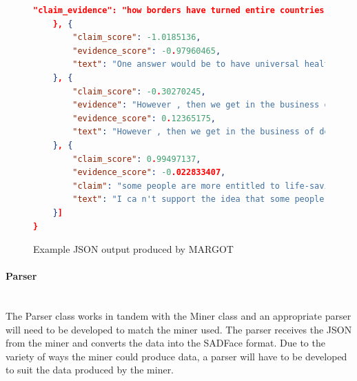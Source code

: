 \documentclass[12pt,a4paper]{article}
\begin{document}
\begin{figure}[H]
\begin{lstlisting}[language=json,firstnumber=1]
		"claim_evidence": "how borders have turned entire countries and regions into warpeople could come over from other countriesa contribution to the American economy to sustain the system"
	}, {
		"claim_score": -1.0185136,
		"evidence_score": -0.97960465,
		"text": "One answer would be to have universal healthcare only for Americans or people residing in America ."
	}, {
		"claim_score": -0.30270245,
		"evidence": "However , then we get in the business of denying healthcare based on immigration status which is morally wrong .",
		"evidence_score": 0.12365175,
		"text": "However , then we get in the business of denying healthcare based on immigration status which is morally wrong ."
	}, {
		"claim_score": 0.99497137,
		"evidence_score": -0.022833407,
		"claim": "some people are more entitled to life-saving care than others based on a piece of documentation",
		"text": "I ca n't support the idea that some people are more entitled to life-saving care than others based on a piece of documentation ."
	}]
}
    \end{lstlisting}
    \caption{Example JSON output produced by MARGOT}
    \label{fig:margot}
\end{figure}

\paragraph{Parser}\mbox{}\\

The Parser class works in tandem with the Miner class and an appropriate parser will need to be developed to match the miner used. The parser receives the JSON from the miner and converts the data into the SADFace format. Due to the variety of ways the miner could produce data, a parser will have to be developed to suit the data produced by the miner.
\end{document}
